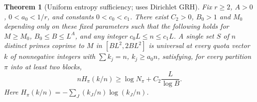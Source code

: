 \documentclass[11pt]{article}
\newtheorem{theorem}{Theorem}[section]
\theoremstyle{definition}\newtheorem{remark}[theorem]{Remark}
\begin{document}
\begin{theorem}[Uniform entropy sufficiency; uses Dirichlet GRH]\label{thm:uniform}
Fix $r\ge2$, $A>0$, $0<a_0<1/r$, and constants $0<c_0<c_1$. There exist $C_2>0$, $B_0>1$ and $M_0$ depending only on these fixed parameters such that the following holds for $M\ge M_0$, $B_0\le B\le L^A$, and any integer $c_0 L\le n\le c_1 L$. A single set $S$ of $n$ distinct primes coprime to $M$ in $[BL^2,2BL^2]$ is universal at every quota vector $k$ of nonnegative integers with $\sum k_j=n$, $k_j\ge a_0 n$, satisfying, for every partition $\pi$ into at least two blocks,
\begin{equation}\label{eq:slack}
 nH_\pi(k/n)\ge\log N_\pi+C_2\frac{L}{\log B}.
\end{equation}
Here $H_\pi(k/n)=-\sum_J(k_J/n)\log(k_J/n)$.
\end{theorem}
\end{document}
